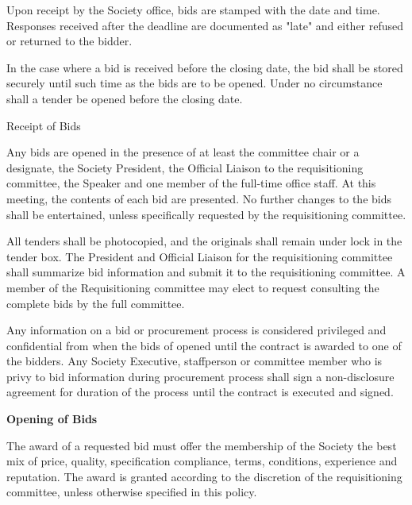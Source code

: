 \begin{longenum}[label*=\thesection.\arabic*., align=left]
\begin{longenum} [label*=\arabic*., align=left]
		\item Upon receipt by the Society office, bids are stamped with the date and time. Responses received after the deadline are documented as "late" and either refused or returned to the bidder.
		
		\item In the case where a bid is received before the closing date, the bid shall be stored securely until such time as the bids are to be opened. Under no circumstance shall a tender be opened before the closing date.
\end{longenum}

\item \textbf\textit{}{Receipt of Bids}

\begin{longenum} [label*=\arabic*., align=left]
		\item Any bids are opened in the presence of at least the committee chair or a designate, the Society President, the Official Liaison to the requisitioning committee, the Speaker and one member of the full-time office staff. At this meeting, the contents of each bid are presented. No further changes to the bids shall be entertained, unless specifically requested by the requisitioning committee. 
		
		\item All tenders shall be photocopied, and the originals shall remain under lock in the tender box. The President and Official Liaison for the requisitioning committee shall summarize bid information and submit it to the requisitioning committee. A member of the Requisitioning committee may elect to request consulting the complete bids by the full committee.
		
		\item Any information on a bid or procurement process is considered privileged and confidential from when the bids of opened until the contract is awarded to one of the bidders. Any Society Executive, staffperson or committee member who is privy to bid information during procurement process shall sign a non-disclosure agreement for duration of the process until the contract is executed and signed. 
\end{longenum}

\item \textbf{Opening of Bids}

\begin{longenum} [label*=\arabic*., align=left]
		\item The award of a requested bid must offer the membership of the Society the best mix of price, quality, specification compliance, terms, conditions, experience and reputation. The award is granted according to the discretion of the requisitioning committee, unless otherwise specified in this policy. 
		

\end{longenum}
\end{longenum}
